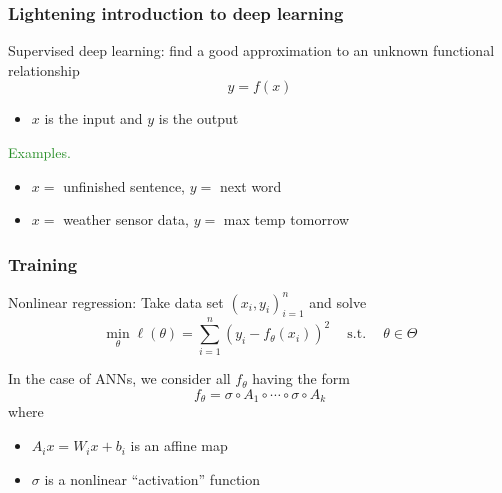 \documentclass[
    xcolor={svgnames,dvipsnames},
    hyperref={colorlinks, citecolor=DeepPink4, linkcolor=DarkRed, urlcolor=DarkBlue}
    ]{beamer}  %
\newcommand{\Egs}{\textcolor{ForestGreen}{Examples. }}
\newcommand{\st}{\ensuremath{\ \mathrm{s.t.}\ }}
\newcommand{\1}{\mathbbm 1}
\begin{document}
\begin{frame}
    \frametitle{Lightening introduction to deep learning}
    
    Supervised deep learning: find a good approximation to an unknown functional
    relationship
    \begin{equation*}
        y = f(x)
    \end{equation*}

    \begin{itemize}
        \item $x$ is the input and $y$ is the output
    \end{itemize}

        \vspace{0.5em}
        \vspace{0.5em}
        \vspace{0.5em}
    \Egs
    \begin{itemize}
        \item $x = $ unfinished sentence, $y = $ next word
        \vspace{0.5em}
        \item $x = $ weather sensor data, $y = $ max temp tomorrow
    \end{itemize}

\end{frame}


\begin{frame}
    \frametitle{Training}

    Nonlinear regression: Take data set $(x_i, y_i)_{i=1}^n$ and solve
    \begin{equation*}
        \min_\theta  \ell(\theta) = \sum_{i=1}^n (y_i - f_\theta(x_i))^2
        \quad \st \quad \theta \in \Theta
    \end{equation*}

    \vspace{0.5em}
    In the case of ANNs, we consider all $f_\theta$ having the form
    \begin{equation*}
        f_\theta
        = \sigma \circ A_{1} \circ \cdots \circ \sigma \circ A_{k} 
    \end{equation*}
    where
    \begin{itemize}
        \item $A_{i} x = W_{i} x + b_{i} $ is an affine map 
        \vspace{0.5em}
        \item $\sigma$ is a nonlinear ``activation'' function
    \end{itemize}

\end{frame}
\end{document}
